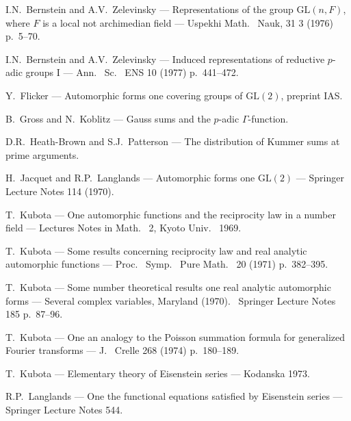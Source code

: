 \documentclass[12pt,a4paper]{article}
\theoremstyle{plain}
\theoremstyle{definition}
\theoremstyle{remark}
\begin{document}
\begin{enumerate}[label={[\arabic*]}]
\item I.N.\ Bernstein and A.V.\ Zelevinsky --- Representations of the group $\mathrm{GL}(n, F)$, where $F$ is a local not archimedian field --- Uspekhi Math.
\ Nauk, 31 3 (1976) p.\ 5--70.

\item I.N.\ Bernstein and A.V.\ Zelevinsky --- Induced representations of reductive $p$-adic groups I --- Ann.
\ Sc.
\ ENS 10 (1977) p.\ 441--472.

\item Y.\ Flicker --- Automorphic forms one covering groups of $\mathrm{GL}(2)$, preprint IAS.

\item B.\ Gross and N.\ Koblitz --- Gauss sums and the $p$-adic $\Gamma$-function.

\item D.R.\ Heath-Brown and S.J.\ Patterson --- The distribution of Kummer sums at prime arguments.

\item H.\ Jacquet and R.P.\ Langlands --- Automorphic forms one $\mathrm{GL}(2)$ --- Springer Lecture Notes 114 (1970).

\item T.\ Kubota --- One automorphic functions and the reciprocity law in a number field --- Lectures Notes in Math.
\ 2, Kyoto Univ.
\ 1969.

\item T.\ Kubota --- Some results concerning reciprocity law and real analytic automorphic functions --- Proc.
\ Symp.
\ Pure Math.
\ 20 (1971) p.\ 382--395.

\item T.\ Kubota --- Some number theoretical results one real analytic automorphic forms --- Several complex variables, Maryland (1970).
\ Springer Lecture Notes 185 p.\ 87--96.

\item T.\ Kubota --- One an analogy to the Poisson summation formula for generalized Fourier transforms --- J.
\ Crelle 268 (1974) p.\ 180--189.

\item T.\ Kubota --- Elementary theory of Eisenstein series --- Kodanska 1973.

\item R.P.\ Langlands --- One the functional equations satisfied by Eisenstein series --- Springer Lecture Notes 544.


\end{enumerate}
\end{document}

